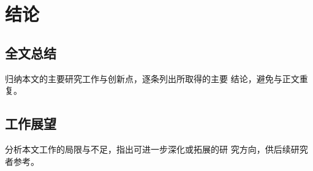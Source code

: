 \chapter{结论}
\label{chap:conclusion}

\section{全文总结}
\hspace{2em}归纳本文的主要研究工作与创新点，逐条列出所取得的主要
结论，避免与正文重复。

\section{工作展望}
\hspace{2em}分析本文工作的局限与不足，指出可进一步深化或拓展的研
究方向，供后续研究者参考。
